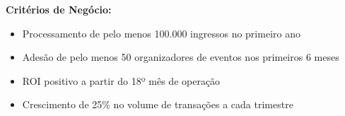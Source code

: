 \textbf{Critérios de Negócio:}
\begin{itemize}
    \item Processamento de pelo menos 100.000 ingressos no primeiro ano
    \item Adesão de pelo menos 50 organizadores de eventos nos primeiros 6 meses
    \item ROI positivo a partir do 18º mês de operação
    \item Crescimento de 25\% no volume de transações a cada trimestre
\end{itemize}
